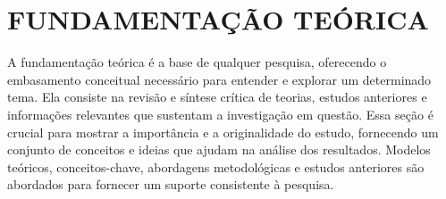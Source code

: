 


\section{\textbf{FUNDAMENTAÇÃO TEÓRICA}}
    \label{cha:fundamentacao-teorica}

    A fundamentação teórica é a base de qualquer pesquisa, oferecendo o embasamento conceitual necessário para entender e explorar um determinado tema. Ela consiste na revisão e síntese crítica de teorias, estudos anteriores e informações relevantes que sustentam a investigação em questão. Essa seção é crucial para mostrar a importância e a originalidade do estudo, fornecendo um conjunto de conceitos e ideias que ajudam na análise dos resultados. Modelos teóricos, conceitos-chave, abordagens metodológicas e estudos anteriores são abordados para fornecer um suporte consistente à pesquisa.

    
\newpage
